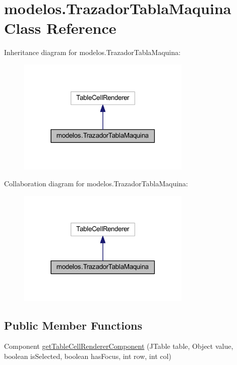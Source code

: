 \hypertarget{classmodelos_1_1_trazador_tabla_maquina}{}\section{modelos.\+Trazador\+Tabla\+Maquina Class Reference}
\label{classmodelos_1_1_trazador_tabla_maquina}


Inheritance diagram for modelos.\+Trazador\+Tabla\+Maquina\+:\nopagebreak
\begin{figure}[H]
\begin{center}
\leavevmode
\includegraphics[width=234pt]{classmodelos_1_1_trazador_tabla_maquina__inherit__graph}
\end{center}
\end{figure}


Collaboration diagram for modelos.\+Trazador\+Tabla\+Maquina\+:\nopagebreak
\begin{figure}[H]
\begin{center}
\leavevmode
\includegraphics[width=234pt]{classmodelos_1_1_trazador_tabla_maquina__coll__graph}
\end{center}
\end{figure}
\subsection*{Public Member Functions}
\begin{DoxyCompactItemize}
\item 
Component \mbox{\hyperlink{classmodelos_1_1_trazador_tabla_maquina_a2ea391f01832f424c6e212bd8ff86484}{get\+Table\+Cell\+Renderer\+Component}} (J\+Table table, Object value, boolean is\+Selected, boolean has\+Focus, int row, int col)
\end{DoxyCompactItemize}


